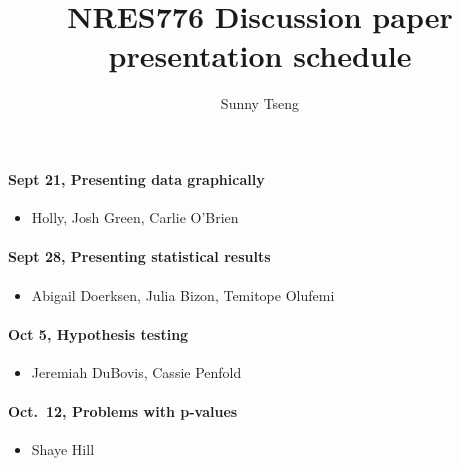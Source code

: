 \documentclass[
  letterpaper,
  DIV=11,
  numbers=noendperiod]{scrartcl}
\title{NRES776 Discussion paper presentation schedule}
\author{Sunny Tseng}
\date{}
\let\oldparagraph\paragraph
\renewcommand{\paragraph}[1]{\oldparagraph{#1}\mbox{}}
\providecommand{\tightlist}{%
  \setlength{\itemsep}{0pt}\setlength{\parskip}{0pt}}\usepackage{longtable,booktabs,array}
\begin{document}
\maketitle
\ifdefined\Shaded\renewenvironment{Shaded}{\begin{tcolorbox}[frame hidden, interior hidden, boxrule=0pt, borderline west={3pt}{0pt}{shadecolor}, breakable, enhanced, sharp corners]}{\end{tcolorbox}}\fi

\hypertarget{sept-21-presenting-data-graphically}{%
\paragraph{Sept 21, Presenting data
graphically}\label{sept-21-presenting-data-graphically}}

\begin{itemize}
\tightlist
\item
  Holly, Josh Green, Carlie O'Brien
\end{itemize}

\hypertarget{sept-28-presenting-statistical-results}{%
\paragraph{Sept 28, Presenting statistical
results}\label{sept-28-presenting-statistical-results}}

\begin{itemize}
\tightlist
\item
  Abigail Doerksen, Julia Bizon, Temitope Olufemi
\end{itemize}

\hypertarget{oct-5-hypothesis-testing}{%
\paragraph{Oct 5, Hypothesis testing}\label{oct-5-hypothesis-testing}}

\begin{itemize}
\tightlist
\item
  Jeremiah DuBovis, Cassie Penfold
\end{itemize}

\hypertarget{oct.-12-problems-with-p-values}{%
\paragraph{Oct.~12, Problems with
p-values}\label{oct.-12-problems-with-p-values}}

\begin{itemize}
\tightlist
\item
  Shaye Hill
\end{itemize}
\end{document}
